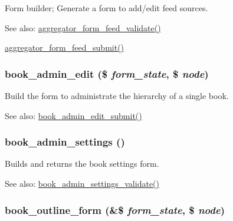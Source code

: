 Form builder; Generate a form to add/edit feed sources.

\begin{Desc}
\item[See also:]\hyperlink{aggregator_8admin_8inc_4a4b42f6a1e73d72fb1e55c0f20fcf02}{aggregator\_\-form\_\-feed\_\-validate()} 

\hyperlink{aggregator_8admin_8inc_f98f428f07034e19622342875fe30984}{aggregator\_\-form\_\-feed\_\-submit()} \end{Desc}
\hypertarget{group__forms_g3add8d3b6439de3883a30986428fdc87}{
\subsubsection[{book\_\-admin\_\-edit}]{\setlength{\rightskip}{0pt plus 5cm}book\_\-admin\_\-edit (\$ {\em form\_\-state}, \/  \$ {\em node})}}
\label{group__forms_g3add8d3b6439de3883a30986428fdc87}


Build the form to administrate the hierarchy of a single book.

\begin{Desc}
\item[See also:]\hyperlink{book_8admin_8inc_f0fb9b52db15bf3bc44c63d5b9042c69}{book\_\-admin\_\-edit\_\-submit()}\end{Desc}
\hypertarget{group__forms_g036f1d2ed17d79b71545c955c864cf2e}{
\subsubsection[{book\_\-admin\_\-settings}]{\setlength{\rightskip}{0pt plus 5cm}book\_\-admin\_\-settings ()}}
\label{group__forms_g036f1d2ed17d79b71545c955c864cf2e}


Builds and returns the book settings form.

\begin{Desc}
\item[See also:]\hyperlink{book_8admin_8inc_18c68be0c946b1fdf59bed35fc266d60}{book\_\-admin\_\-settings\_\-validate()} \end{Desc}
\hypertarget{group__forms_g63f60eeeafbddc518906941101553538}{
\subsubsection[{book\_\-outline\_\-form}]{\setlength{\rightskip}{0pt plus 5cm}book\_\-outline\_\-form (\&\$ {\em form\_\-state}, \/  \$ {\em node})}}
\label{group__forms_g63f60eeeafbddc518906941101553538}


